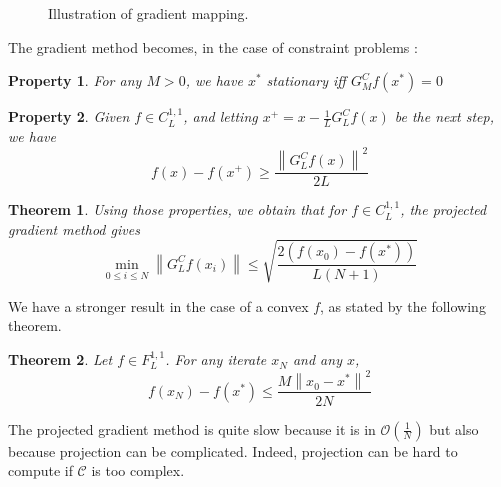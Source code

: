 \documentclass[a4paper]{article}
\begin{document}
\begin{figure}[H]
\centering
\caption{Illustration of gradient mapping.}
\label {tik2}
\end{figure}

The gradient method becomes, in the case of constraint problems :\\[.3cm]
\hspace*{2cm}

\newtheorem{prop1}{Property} 
\begin{prop1}
For any $M>0$, we have $x^*$ stationary iff $G_M^C f(x^*)=0$
\end{prop1}

\begin{prop1}
Given $f \in C^{1,1}_L$, and letting $x^+ = x - \frac{1}{L}G^C_L f(x)$ be the next step, we have
\[
    f(x) - f(x^+) \ge \frac{\left\|G_L^C f(x)\right\|^2}{2L}
\]

\end{prop1}

\newtheorem{theo1}{Theorem} 
\begin{theo1} Using those properties, we obtain that for $f \in C_L^{1,1}$, the projected gradient method gives
\begin{equation*}
\min_{0\leq i \leq N} \left\|G_L^C f(x_i)\right\| \leq \sqrt{\frac{2(f(x_0) - f(x^*))}{L(N+1)}}
\end{equation*}
\end{theo1}
We have a stronger result in the case of a convex $f$, as stated by the following theorem.
\begin{theo1}
Let $f \in F_L^{1,1}$. For any iterate $x_N$ and any $x$,
\begin{equation*}
f(x_N) - f(x^*) \leq \frac{M\left\|x_0 - x^*\right\|^2}{2N}
\end{equation*}
\end{theo1}
\noindent
The projected gradient method is quite slow because it is in $\mathcal{O}(\frac{1}{N})$ but also because projection can be complicated. Indeed, projection can be hard to compute if $\mathcal{C}$ is too complex.
\end{document}
